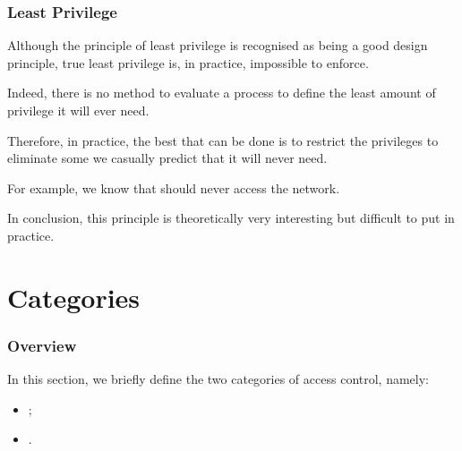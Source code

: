 
\begin{frame}
  \frametitle{Least Privilege}

  Although the principle of least privilege is recognised as being a
  good design principle, true least privilege is, in practice, impossible
  to enforce.

  \-

  Indeed, there is no method to evaluate a process to define the least
  amount of privilege it will ever need.

  \-

  Therefore, in practice, the best that can be done is to restrict the
  privileges to eliminate some we casually predict that it will never need.

  \-

  For example, we know that  should never access the network.

  \-

  In conclusion, this principle is theoretically very interesting but
  difficult to put in practice.
\end{frame}

%
%

\section{Categories}


\begin{frame}
  \frametitle{Overview}

  In this section, we briefly define the two categories of access control,
  namely:

  \begin{itemize}
    \item
      ;
    \item
      .
  \end{itemize}
\end{frame}


